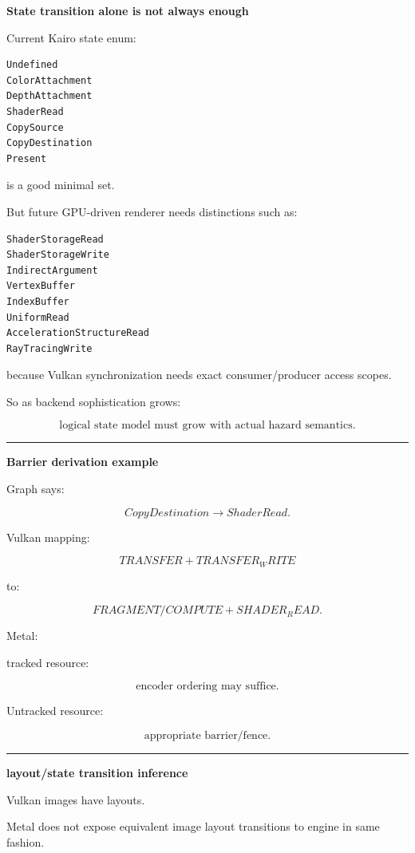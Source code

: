 \textbf{State transition alone is not always enough}

Current Kairo state enum:

\begin{verbatim}
Undefined
ColorAttachment
DepthAttachment
ShaderRead
CopySource
CopyDestination
Present
\end{verbatim}

is a good minimal set.

But future GPU-driven renderer needs distinctions such as:

\begin{verbatim}
ShaderStorageRead
ShaderStorageWrite
IndirectArgument
VertexBuffer
IndexBuffer
UniformRead
AccelerationStructureRead
RayTracingWrite
\end{verbatim}

because Vulkan synchronization needs exact consumer/producer access scopes.

So as backend sophistication grows:

\[
\boxed{
\text{logical state model must grow with actual hazard semantics}.
}
\]

\begin{center}\rule{0.5\linewidth}{0.5pt}\end{center}

\textbf{Barrier derivation example}

Graph says:

\[
CopyDestination
\rightarrow
ShaderRead.
\]

Vulkan mapping:

\[
TRANSFER
+
TRANSFER_WRITE
\]

to:

\[
FRAGMENT/COMPUTE
+
SHADER_READ.
\]

Metal:

tracked resource:

\[
\text{encoder ordering may suffice}.
\]

Untracked resource:

\[
\text{appropriate barrier/fence}.
\]

\begin{center}\rule{0.5\linewidth}{0.5pt}\end{center}

\textbf{layout/state transition inference}

Vulkan images have layouts.

Metal does not expose equivalent image layout transitions to engine in same fashion.

